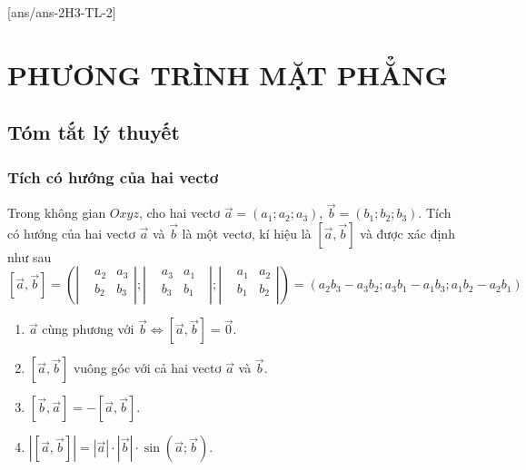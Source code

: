 [ans/ans-2H3-TL-2]
\setcounter{dang}{0}
\setcounter{vd}{0}
\section{PHƯƠNG TRÌNH MẶT PHẲNG}
\subsection{Tóm tắt lý thuyết}
\begin{tomtat}
	\subsubsection{Tích có hướng của hai vectơ }
	\begin{dn}
		Trong không gian $Oxyz$, cho hai vectơ $\vec{a}=(a_1;a_2;a_3 )$, $\vec{b}=(b_1;b_2;b_3 )$. Tích có hướng của hai vectơ $\vec{a}$ và $\vec{b}$ là một vectơ, kí hiệu là $\left[ \vec{a},\vec{b} \right]$ và được xác định như sau
		$$\left[ \overrightarrow{a},\overrightarrow{b} \right]=\left( \left| \begin{aligned}
		& a_2&a_3 \\
		& b_2&b_3 \\
		\end{aligned} \right|;\left| \begin{aligned}
		& a_3&a_1\text{ } \\
		& b_3&b_1 \\
		\end{aligned} \right|;\left| \begin{aligned}
		& a_1&a_2 \\
		& b_1&b_2 \\
		\end{aligned} \right| \right)=\left( a_2b_3-a_3b_2;a_3b_1-a_1b_3;a_1b_2-a_2b_1 \right)$$
		
	\end{dn}
	\begin{tc}
		\begin{enumerate}
			\item $\vec{a}$ cùng phương với $\vec{b}$$\Leftrightarrow \left[ \vec{a},\vec{b} \right]=\vec{0}$.
			\item $\left[ \vec{a},\vec{b} \right]$ vuông góc với cả hai vectơ $\vec{a}$ và $\vec{b}$.
			\item $\left[ \vec{b},\vec{a} \right]=-\left[ \vec{a},\vec{b} \right]$.
			\item $\left| \left[ \vec{a},\vec{b} \right] \right|=\left| \vec{a} \right|\cdot \left| \vec{b} \right|\cdot \sin (\vec{a};\vec{b} )$.
		\end{enumerate}
	\end{tc}

\end{tomtat}
